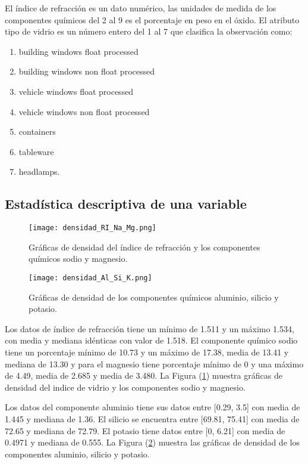 El índice de refracción es un dato numérico, las unidades de medida de los componentes químicos del 2 al 9 es el porcentaje en peso en el óxido. El atributo tipo de vidrio es un número entero del 1 al 7 que clasifica la observación como:
\begin{enumerate}
	\item building windows float processed
	\item building windows non float processed
	\item vehicle windows float processed
	\item vehicle windows non float processed
	\item containers
	\item tableware
	\item headlamps.
\end{enumerate}

\subsection{Estadística descriptiva de una variable} \label{subsec:estadisticadescriptivauna}

\begin{figure}
	\centering
	\texttt{[image: densidad\_RI\_Na\_Mg.png]}
	\caption{Gráficas de densidad del índice de refracción y los componentes químicos sodio y magnesio.} \label{fig:RINaMg}
\end{figure}

\begin{figure}
	\centering
	\texttt{[image: densidad\_Al\_Si\_K.png]}
	\caption{Gráficas de densidad de los componentes químicos aluminio, silicio y potasio.} \label{fig:AlSiK}
\end{figure}

Los datos de índice de refracción tiene un mínimo de 1.511 y un máximo 1.534, con media y mediana idénticas con valor de 1.518. El componente químico sodio tiene un porcentaje mínimo de 10.73 y un máximo de 17.38, media de 13.41 y mediana de 13.30 y para el magnesio tiene porcentaje mínimo de 0 y una máximo de 4.49, media de 2.685 y media de 3.480. La Figura (\ref{fig:RINaMg}) muestra gráficas de densidad del indice de vidrio y los componentes sodio y magnesio.

Los datos del componente aluminio tiene sus datos entre [0.29, 3.5] con media de 1.445 y mediana de 1.36. El silicio se encuentra entre [69.81, 75.41] con media de 72.65 y mediana de 72.79. El potasio tiene datos entre [0, 6.21] con media de 0.4971 y mediana de 0.555. La Figura (\ref{fig:AlSiK}) muestra las gráficas de densidad de los componentes aluminio, silicio y potasio.

